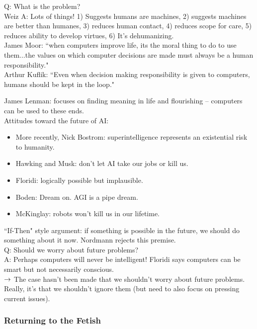 Q: What is the problem? \\

Weiz A: Lots of things! 1) Suggests humans are machines, 2) suggests machines are better than humanes, 3) reduces human contact, 4) reduces scope for care, 5) reduces ability to develop virtues, 6) It's dehumanizing. \\

James Moor: ``when computers improve life, its the moral thing to do to use them...the values on which computer decisions are made must always be a human responsibility." \\

Arthur Kuflik: ``Even when decision making responsibility is given to computers, humans should be kept in the loop."

James Lenman: focuses on finding meaning in life and flourishing -- computers can be used to these ends. \\



Attitudes toward the future of AI:
\begin{itemize}
\item More recently, Nick Bostrom: superintelligence represents an existential risk to humanity.

\item Hawking and Musk: don't let AI take our jobs or kill us.
\item Floridi: logically possible but implausible.
\item Boden: Dream on. AGI is a pipe dream.
\item McKinglay: robots won't kill us in our lifetime.
\end{itemize}

``If-Then" style argument: if something is possible in the future, we should do something about it now. Nordmann rejects this premise. \\

Q: Should we worry about future problems? \\

A: Perhaps computers will never be intelligent! Floridi says computers can be smart but not necessarily conscious. \\

$\rightarrow$ The case hasn't been made that we shouldn't worry about future problems. Really, it's that we shouldn't ignore them (but need to also focus on pressing current issues). \\

\subsubsection{Returning to the Fetish}

